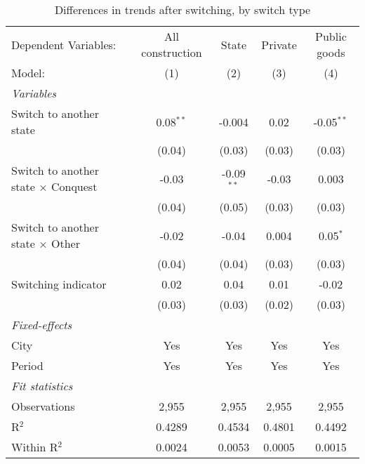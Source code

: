 \begin{table}[htbp]
   \caption{\label{tab:baseline_100y} Differences in trends after switching, by switch type}
   \centering
   \begin{tabular}{lcccc}
      \tabularnewline \midrule \midrule
      Dependent Variables:                       & All construction & State        & Private & Public goods\\  
      Model:                                     & (1)              & (2)          & (3)     & (4)\\  
      \midrule
      \emph{Variables}\\
      Switch to another state                    & 0.08$^{**}$      & -0.004       & 0.02    & -0.05$^{**}$\\   
                                                 & (0.04)           & (0.03)       & (0.03)  & (0.03)\\   
      Switch to another state $\times$ Conquest  & -0.03            & -0.09$^{**}$ & -0.03   & 0.003\\   
                                                 & (0.04)           & (0.05)       & (0.03)  & (0.03)\\   
      Switch to another state $\times$ Other     & -0.02            & -0.04        & 0.004   & 0.05$^{*}$\\   
                                                 & (0.04)           & (0.04)       & (0.03)  & (0.03)\\   
      Switching indicator                        & 0.02             & 0.04         & 0.01    & -0.02\\   
                                                 & (0.03)           & (0.03)       & (0.02)  & (0.03)\\   
      \midrule
      \emph{Fixed-effects}\\
      City                                       & Yes              & Yes          & Yes     & Yes\\  
      Period                                     & Yes              & Yes          & Yes     & Yes\\  
      \midrule
      \emph{Fit statistics}\\
      Observations                               & 2,955            & 2,955        & 2,955   & 2,955\\  
      R$^2$                                      & 0.4289           & 0.4534       & 0.4801  & 0.4492\\  
      Within R$^2$                               & 0.0024           & 0.0053       & 0.0005  & 0.0015\\  
      \midrule \midrule
      

\end{tabular}
\end{table}
